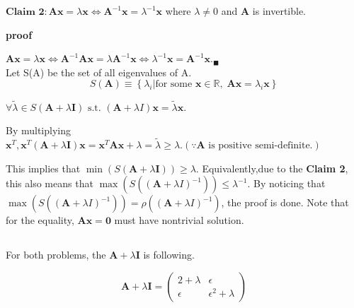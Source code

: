 \documentclass[12pt]{article}
\begin{document}
\noindent$\textbf{Claim 2} : \boldsymbol{A}\boldsymbol{x} = \lambda \boldsymbol{x} \iff \boldsymbol{A}^{-1}\boldsymbol{x} = \lambda^{-1} \boldsymbol{x}$ where $\lambda \ne 0$ and $\boldsymbol{A}$ is invertible. 

\noindent\textbf{proof}

$\boldsymbol{A}\boldsymbol{x} = \lambda \boldsymbol{x} \iff \boldsymbol{A}^{-1}\boldsymbol{A}\boldsymbol{x} = \lambda \boldsymbol{A}^{-1}\boldsymbol{x} \iff \lambda^{-1} \boldsymbol{x} = \boldsymbol{A}^{-1} \boldsymbol{x}._\blacksquare$
\\

\noindent
Let S(A) be the set of all eigenvalues of A.
\begin{equation}
    S(\boldsymbol{A}) \equiv \left\{\lambda_i | \text{for some } \boldsymbol{x} \in \mathbb{R},\; \boldsymbol{A}\boldsymbol{x} = \lambda_i \boldsymbol{x} \right\}
\end{equation}

\noindent
$\forall \tilde{\lambda} \in S(\boldsymbol{A}+\lambda \boldsymbol{I}) \text{ s.t. } (\boldsymbol{A}+\lambda I)\boldsymbol{x} = \tilde{\lambda}\boldsymbol{x}.$ 

\noindent
By multiplying $\boldsymbol{x}^T, \boldsymbol{x}^T (\boldsymbol{A} + \lambda \boldsymbol{I}) \boldsymbol{x} =  \boldsymbol{x}^T \boldsymbol{A} \boldsymbol{x} + \lambda = \tilde{\lambda} \ge \lambda.(\because \boldsymbol{A} \text{ is positive semi-definite.})$

\noindent
This implies that $\min(S(\boldsymbol{A}+\lambda \boldsymbol{I})) \ge \lambda$. Equivalently,due to the \textbf{Claim 2}, this also means that $\max(S((\boldsymbol{A} + \lambda I)^{-1})) \le \lambda^{-1}$. By noticing that $\max(S((\boldsymbol{A} + \lambda I)^{-1})) = \rho((\boldsymbol{A} + \lambda I)^{-1})$, the proof is done. Note that for the equality, $\boldsymbol{A}\boldsymbol{x} = \textbf{0}$ must have nontrivial solution. 

\subsection{}
For both problems, the $\boldsymbol{A} + \lambda \boldsymbol{I}$ is following. 

\begin{equation}
    \boldsymbol{A} + \lambda \boldsymbol{I} = \begin{pmatrix}
        2 + \lambda & \epsilon \\ \epsilon & \epsilon^2 + \lambda
    \end{pmatrix}
    \label{eqn:A}
\end{equation}
\end{document}
